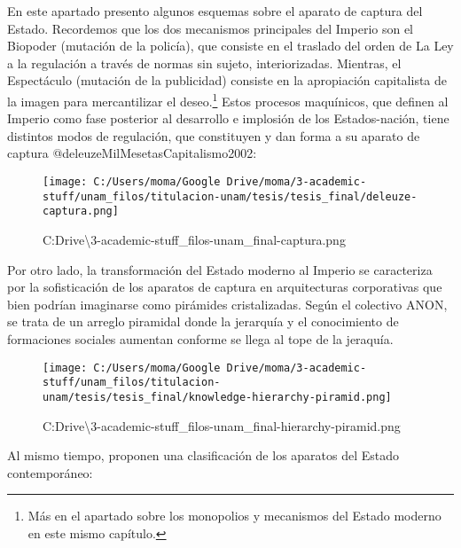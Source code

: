 \documentclass[
]{article}
\begin{document}
En este apartado presento algunos esquemas sobre el aparato de captura
del Estado. Recordemos que los dos mecanismos principales del Imperio
son el Biopoder (mutación de la policía), que consiste en el traslado
del orden de La Ley a la regulación a través de normas sin sujeto,
interiorizadas. Mientras, el Espectáculo (mutación de la publicidad)
consiste en la apropiación capitalista de la imagen para mercantilizar
el deseo.\footnote{Más en el apartado sobre los monopolios y mecanismos
  del Estado moderno en este mismo capítulo.} Estos procesos maquínicos,
que definen al Imperio como fase posterior al desarrollo e implosión de
los Estados-nación, tiene distintos modos de regulación, que constituyen
y dan forma a su aparato de captura @deleuzeMilMesetasCapitalismo2002:

\begin{figure}
\centering
\texttt{[image: C:/Users/moma/Google Drive/moma/3-academic-stuff/unam\_filos/titulacion-unam/tesis/tesis\_final/deleuze-captura.png]}
\caption{C:\Users\moma\Google Drive\moma\textbackslash3-academic-stuff\unam\_filos\titulacion-unam\tesis\tesis\_final\deleuze-captura.png}
\end{figure}

Por otro lado, la transformación del Estado moderno al Imperio se
caracteriza por la sofisticación de los aparatos de captura en
arquitecturas corporativas que bien podrían imaginarse como pirámides
cristalizadas. Según el colectivo ANON, se trata de un arreglo piramidal
donde la jerarquía y el conocimiento de formaciones sociales aumentan
conforme se llega al tope de la jeraquía.

\begin{figure}
\centering
\texttt{[image: C:/Users/moma/Google Drive/moma/3-academic-stuff/unam\_filos/titulacion-unam/tesis/tesis\_final/knowledge-hierarchy-piramid.png]}
\caption{C:\Users\moma\Google Drive\moma\textbackslash3-academic-stuff\unam\_filos\titulacion-unam\tesis\tesis\_final\knowledge-hierarchy-piramid.png}
\end{figure}

Al mismo tiempo, proponen una clasificación de los aparatos del Estado
contemporáneo:
\end{document}
